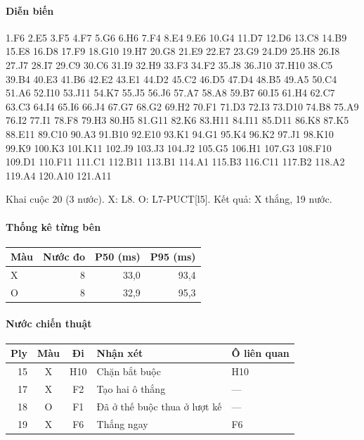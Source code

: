 \paragraph{Diễn biến}
{\footnotesize 1.F6 2.E5 3.F5 4.F7 5.G6 6.H6 7.F4 8.E4 9.E6 10.G4 11.D7 12.D6 13.C8 14.B9 15.E8 16.D8 17.F9 18.G10 19.H7 20.G8 21.E9 22.E7 23.G9 24.D9 25.H8 26.I8 27.J7 28.I7 29.C9 30.C6 31.I9 32.H9 33.F3 34.F2 35.J8 36.J10 37.H10 38.C5 39.B4 40.E3 41.B6 42.E2 43.E1 44.D2 45.C2 46.D5 47.D4 48.B5 49.A5 50.C4 51.A6 52.I10 53.J11 54.K7 55.J5 56.J6 57.A7 58.A8 59.B7 60.I5 61.H4 62.C7 63.C3 64.I4 65.I6 66.J4 67.G7 68.G2 69.H2 70.F1 71.D3 72.I3 73.D10 74.B8 75.A9 76.I2 77.I1 78.F8 79.H3 80.H5 81.G11 82.K6 83.H11 84.I11 85.D11 86.K8 87.K5 88.E11 89.C10 90.A3 91.B10 92.E10 93.K1 94.G1 95.K4 96.K2 97.J1 98.K10 99.K9 100.K3 101.K11 102.J9 103.J3 104.J2 105.G5 106.H1 107.G3 108.F10 109.D1 110.F11 111.C1 112.B11 113.B1 114.A1 115.B3 116.C11 117.B2 118.A2 119.A4 120.A10 121.A11\par}
Khai cuộc 20 (3 nước). X: L8. O: L7-PUCT[l5]. Kết quả: X thắng, 19 nước.
\paragraph{Thống kê từng bên}
\begin{center}\small
\begin{tabular}{@{}lrrr@{}}
\toprule
Màu & Nước đo & P50 (ms) & P95 (ms) \\
\midrule
X & 8 & 33,0 & 93,4 \\
O & 8 & 32,9 & 95,3 \\
\bottomrule
\end{tabular}
\end{center}
\paragraph{Nước chiến thuật}
\begin{center}\small
\begin{tabular}{@{}rccll@{}}
\toprule
Ply & Màu & Đi & Nhận xét & Ô liên quan \\
\midrule
15 & X & H10 & Chặn bắt buộc & H10 \\
17 & X & F2 & Tạo hai ô thắng & — \\
18 & O & F1 & Đã ở thế buộc thua ở lượt kế & — \\
19 & X & F6 & Thắng ngay & F6 \\
\bottomrule
\end{tabular}
\end{center}
